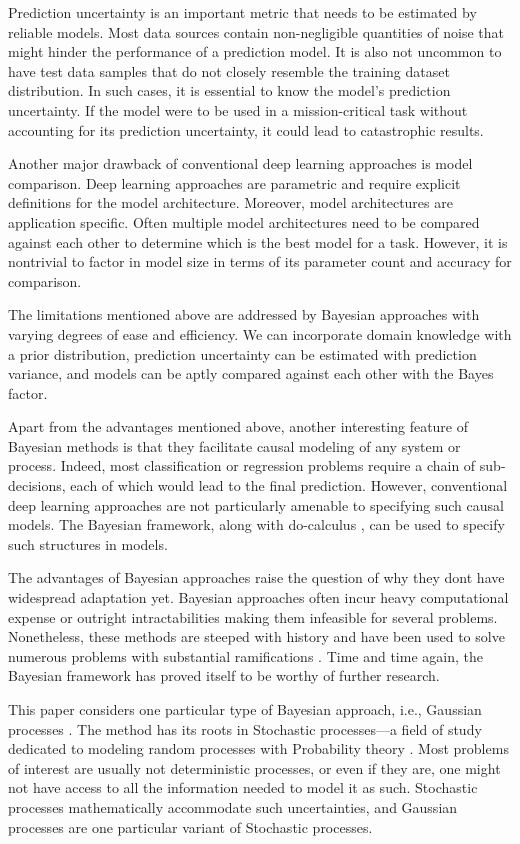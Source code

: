 \documentclass[letterpaper,11pt]{extarticle}
\begin{document}
Prediction uncertainty is an important metric that needs to be estimated by reliable models. Most data sources contain non-negligible quantities of noise that might hinder the performance of a prediction model. It is also not uncommon to have test data samples that do not closely resemble the training dataset distribution. In such cases, it is essential to know the model's prediction uncertainty. If the model were to be used in a mission-critical task without accounting for its prediction uncertainty, it could lead to catastrophic results. 

Another major drawback of conventional deep learning approaches is model comparison. Deep learning approaches are parametric and require explicit definitions for the model architecture. Moreover, model architectures are application specific. Often multiple model architectures need to be compared against each other to determine which is the best model for a task. However, it is nontrivial to factor in model size in terms of its parameter count and accuracy for comparison. 

The limitations mentioned above are addressed by Bayesian approaches with varying degrees of ease and efficiency. We can incorporate domain knowledge with a prior distribution, prediction uncertainty can be estimated with prediction variance, and models can be aptly compared against each other with the Bayes factor.

Apart from the advantages mentioned above, another interesting feature of Bayesian methods is that they facilitate causal modeling of any system or process. Indeed, most classification or regression problems require a chain of sub-decisions, each of which would lead to the final prediction. However, conventional deep learning approaches are not particularly amenable to specifying such causal models. The Bayesian framework, along with do-calculus \cite{Pearl00, PearlM18}, can be used to specify such structures in models. 

The advantages of Bayesian approaches raise the question of why they dont have widespread adaptation yet.  Bayesian approaches often incur heavy computational expense or outright intractabilities making them infeasible for several problems. Nonetheless, these methods are steeped with history and have been used to solve numerous problems with substantial ramifications \cite{Mcgrayne11}. Time and time again, the Bayesian framework has proved itself to be worthy of further research. 

This paper considers one particular type of Bayesian approach, i.e., Gaussian processes \cite{RasmussenW06}. The method has its roots in Stochastic processes—a field of study dedicated to modeling random processes with Probability theory \cite{Klebaner12,Rosenthal06}. Most problems of interest are usually not deterministic processes, or even if they are, one might not have access to all the information needed to model it as such. Stochastic processes mathematically accommodate such uncertainties, and Gaussian processes are one particular variant of Stochastic processes. 
\end{document}
